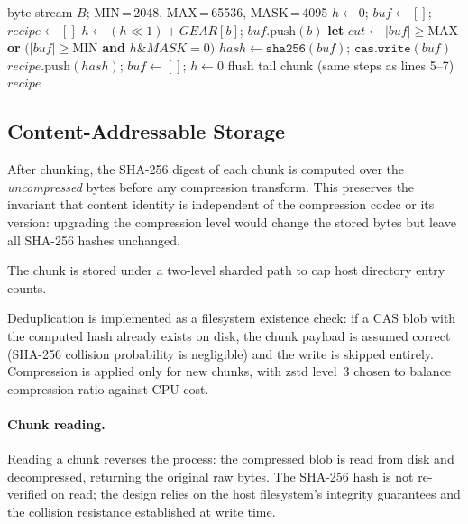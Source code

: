 \documentclass[5p,times]{elsarticle}
\begin{document}
\begin{algorithm}
\caption{CDC Boundary Detection (\texttt{create\_recipe\_from\_data()})}
\label{alg:cdc}
\small
\begin{algorithmic}[1]
\REQUIRE byte stream $B$; MIN\,=\,2048, MAX\,=\,65536, MASK\,=\,4095
\STATE $h \leftarrow 0$;\; $\mathit{buf} \leftarrow []$;\;
       $\mathit{recipe} \leftarrow []$
  \STATE $h \leftarrow (h \ll 1) + \mathit{GEAR}[b]$;\;
         $\mathit{buf}.\text{push}(b)$
  \STATE \textbf{let} $\mathit{cut} \leftarrow
         |\mathit{buf}| \geq \text{MAX}$ \textbf{or}
         $(|\mathit{buf}| \geq \text{MIN}$ \textbf{and}
         $h \mathbin{\&} \mathit{MASK} = 0)$
    \STATE $\mathit{hash} \leftarrow \texttt{sha256}(\mathit{buf})$;\;
           $\texttt{cas.write}(\mathit{buf})$
    \STATE $\mathit{recipe}.\text{push}(\mathit{hash})$;\;
           $\mathit{buf} \leftarrow []$;\; $h \leftarrow 0$
  \ENDIF
\ENDFOR
{}
  \STATE flush tail chunk (same steps as lines 5--7)
\ENDIF
\RETURN $\mathit{recipe}$
\end{algorithmic}
\end{algorithm}

\subsection{Content-Addressable Storage}
\label{sec:cas}

After chunking, the SHA-256 digest of each chunk is computed over the
\emph{uncompressed} bytes before any compression transform.  This
preserves the invariant that content identity is independent of the
compression codec or its version: upgrading the compression level would
change the stored bytes but leave all SHA-256 hashes unchanged.

The chunk is stored under a two-level sharded path to cap host directory
entry counts.

Deduplication is implemented as a filesystem existence check: if a CAS
blob with the computed hash already exists on disk, the chunk payload is
assumed correct (SHA-256 collision probability is negligible) and the
write is skipped entirely.  Compression is applied only for new chunks,
with zstd level~3 chosen to balance compression ratio against CPU cost.

\paragraph{Chunk reading.}
Reading a chunk reverses the process: the compressed blob is read from
disk and decompressed, returning the original raw bytes.  The SHA-256
hash is not re-verified on read; the design relies on the host
filesystem's integrity guarantees and the collision resistance
established at write time.
\end{document}
